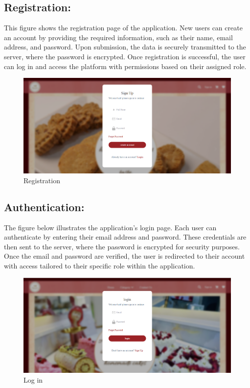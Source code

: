 \newpage
\subsection{Registration:}

This figure shows the registration page of the application. New users can create an account by providing the required information, such as their name, email address, and password. Upon submission, the data is securely transmitted to the server, where the password is encrypted. Once registration is successful, the user can log in and access the platform with permissions based on their assigned role.

\begin{figure}[!h]
\begin{center}
\includegraphics{images/Registration.png}
\end{center}
\caption{Registration}
\end{figure}

\subsection{Authentication:}

The figure below illustrates the application's login page. Each user can authenticate by entering their email address and password. These credentials are then sent to the server, where the password is encrypted for security purposes. Once the email and password are verified, the user is redirected to their account with access tailored to their specific role within the application.

\begin{figure}[!h]
\begin{center}
\includegraphics{images/Authentication.png}
\end{center}
\caption{Log in}
\end{figure}


